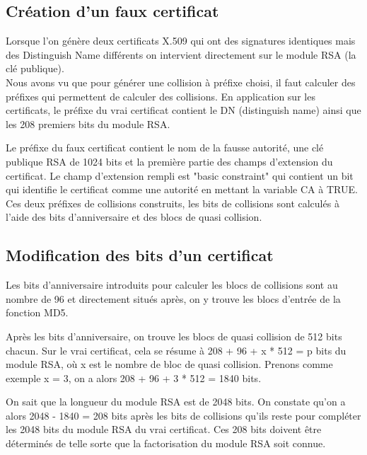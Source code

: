 \subsection{Création d'un faux certificat}
Lorsque l'on génère deux certificats X.509 qui ont des signatures identiques mais des Distinguish Name différents on intervient directement sur le module RSA (la clé publique).\\

Nous avons vu que pour générer une collision à préfixe choisi, il faut calculer des préfixes qui permettent de calculer des collisions. En application sur les certificats, le préfixe du vrai certificat contient le DN (distinguish name) ainsi que les 208 premiers bits du module RSA.

Le préfixe du faux certificat contient le nom de la fausse autorité, une clé publique RSA de 1024 bits et la première partie des champs d'extension du certificat. Le champ d'extension rempli est "basic constraint" qui contient un bit qui identifie le certificat comme une autorité en mettant la variable CA à TRUE.\\

Ces deux préfixes de collisions construits, les bits de collisions sont calculés à l'aide des bits d'anniversaire et des blocs de quasi collision.

\subsection{Modification des bits d'un certificat}
Les bits d'anniversaire introduits pour calculer les blocs de collisions sont au nombre de 96 et directement situés après, on y trouve les blocs d'entrée de la fonction MD5.

Après les bits d'anniversaire, on trouve les blocs de quasi collision de 512 bits chacun. Sur le vrai certificat, cela se résume à 208 + 96 + x * 512 = p bits du module RSA, où x est le nombre de bloc de quasi collision. Prenons comme exemple x = 3, on a alors 208 + 96 + 3 * 512 = 1840 bits.

On sait que la longueur du module RSA est de 2048 bits. On constate qu'on a alors 2048 - 1840 = 208 bits après les bits de collisions qu'ils reste pour compléter les 2048 bits du module RSA du vrai certificat. Ces 208 bits doivent être déterminés de telle sorte que la factorisation du module RSA soit connue.

